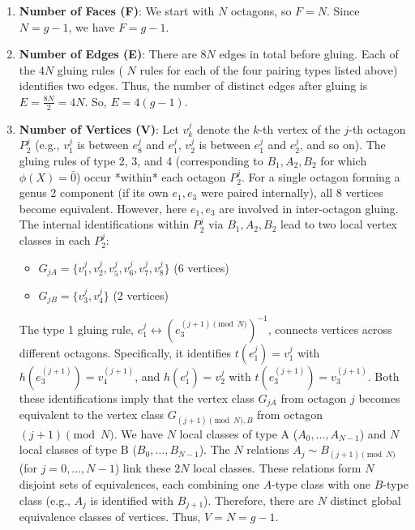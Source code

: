 \documentclass{article}
\theoremstyle{definition}
\theoremstyle{remark}
\begin{document}
\begin{enumerate}
    \item \textbf{Number of Faces (F)}: We start with $N$ octagons, so $F = N$. Since $N=g-1$, we have $F = g-1$.

    \item \textbf{Number of Edges (E)}: There are $8N$ edges in total before gluing. Each of the $4N$ gluing rules ( $N$ rules for each of the four pairing types listed above) identifies two edges. Thus, the number of distinct edges after gluing is $E = \frac{8N}{2} = 4N$. So, $E = 4(g-1)$.

    \item \textbf{Number of Vertices (V)}: Let $v_k^j$ denote the $k$-th vertex of the $j$-th octagon $P_2^j$ (e.g., $v_1^j$ is between $e_8^j$ and $e_1^j$, $v_2^j$ is between $e_1^j$ and $e_2^j$, and so on). The gluing rules of type 2, 3, and 4 (corresponding to $B_1, A_2, B_2$ for which $\phi(X)=\bar{0}$) occur *within* each octagon $P_2^j$. For a single octagon forming a genus 2 component (if its own $e_1, e_3$ were paired internally), all 8 vertices become equivalent. However, here $e_1, e_3$ are involved in inter-octagon gluing. The internal identifications within $P_2^j$ via $B_1, A_2, B_2$ lead to two local vertex classes in each $P_2^j$:
    \begin{itemize}
        \item $G_{jA} = \{v_1^j, v_2^j, v_5^j, v_6^j, v_7^j, v_8^j\}$ (6 vertices)
        \item $G_{jB} = \{v_3^j, v_4^j\}$ (2 vertices)
    \end{itemize}
    The type 1 gluing rule, $e_1^j \leftrightarrow (e_3^{(j+1) \pmod N})^{-1}$, connects vertices across different octagons. Specifically, it identifies $t(e_1^j)=v_1^j$ with $h(e_3^{(j+1)})=v_4^{(j+1)}$, and $h(e_1^j)=v_2^j$ with $t(e_3^{(j+1)})=v_3^{(j+1)}$. Both these identifications imply that the vertex class $G_{jA}$ from octagon $j$ becomes equivalent to the vertex class $G_{(j+1) \pmod N, B}$ from octagon $(j+1) \pmod N$.
    We have $N$ local classes of type A ($A_0, \ldots, A_{N-1}$) and $N$ local classes of type B ($B_0, \ldots, B_{N-1}$). The $N$ relations $A_j \sim B_{(j+1) \pmod N}$ (for $j=0, \ldots, N-1$) link these $2N$ local classes. These relations form $N$ disjoint sets of equivalences, each combining one $A$-type class with one $B$-type class (e.g., $A_j$ is identified with $B_{j+1}$). Therefore, there are $N$ distinct global equivalence classes of vertices.
    Thus, $V = N = g-1$.


\end{enumerate}
\end{document}
